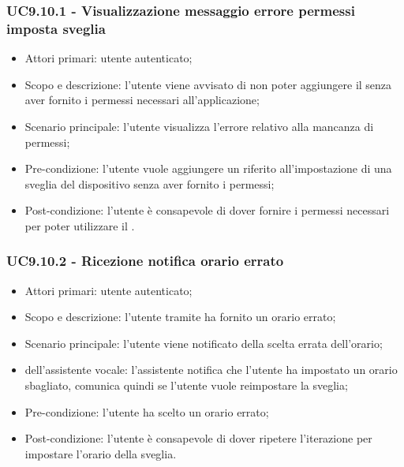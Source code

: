 \subsubsection{UC9.10.1 - Visualizzazione messaggio errore permessi imposta sveglia}
\begin{itemize}
	\item  Attori primari: utente autenticato;
	\item  Scopo e descrizione: l'utente viene avvisato di non poter aggiungere il  senza aver fornito i permessi necessari all'applicazione;
	\item  Scenario principale: l'utente visualizza l'errore relativo alla mancanza di permessi;
	\item  Pre-condizione: l'utente vuole aggiungere un  riferito all'impostazione di una sveglia del dispositivo  senza aver fornito i permessi;
	\item  Post-condizione: l'utente è consapevole di dover fornire i permessi necessari per poter utilizzare il .
\end{itemize}
\subsubsection{UC9.10.2 - Ricezione notifica orario errato}
\begin{itemize}
	\item  Attori primari: utente autenticato;
	\item  Scopo e descrizione: l'utente tramite  ha fornito un orario errato;
	\item  Scenario principale: l'utente viene notificato della scelta errata dell'orario;
	\item  {} dell'assistente vocale: l'assistente notifica che l'utente ha impostato un orario sbagliato, comunica quindi se l'utente vuole reimpostare la sveglia;
	\item  Pre-condizione: l'utente ha scelto un orario errato;
	\item  Post-condizione: l'utente è consapevole di dover ripetere l'iterazione per impostare l'orario della sveglia.
\end{itemize}
